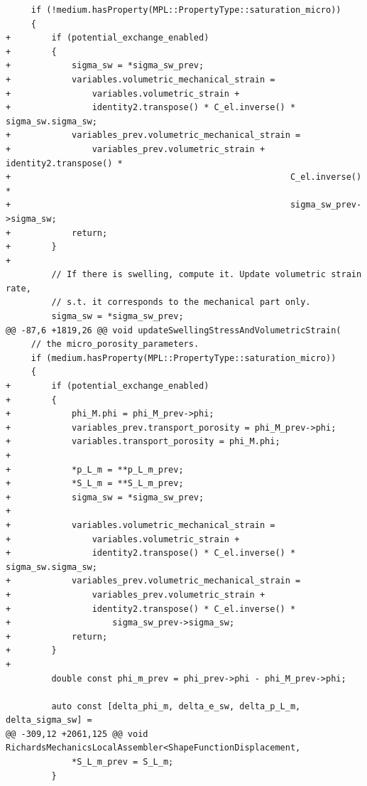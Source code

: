 \documentclass[10pt]{article}
\begin{document}
\begin{lstlisting}
     if (!medium.hasProperty(MPL::PropertyType::saturation_micro))
     {
+        if (potential_exchange_enabled)
+        {
+            sigma_sw = *sigma_sw_prev;
+            variables.volumetric_mechanical_strain =
+                variables.volumetric_strain +
+                identity2.transpose() * C_el.inverse() * sigma_sw.sigma_sw;
+            variables_prev.volumetric_mechanical_strain =
+                variables_prev.volumetric_strain + identity2.transpose() *
+                                                       C_el.inverse() *
+                                                       sigma_sw_prev->sigma_sw;
+            return;
+        }
+
         // If there is swelling, compute it. Update volumetric strain rate,
         // s.t. it corresponds to the mechanical part only.
         sigma_sw = *sigma_sw_prev;
@@ -87,6 +1819,26 @@ void updateSwellingStressAndVolumetricStrain(
     // the micro_porosity_parameters.
     if (medium.hasProperty(MPL::PropertyType::saturation_micro))
     {
+        if (potential_exchange_enabled)
+        {
+            phi_M.phi = phi_M_prev->phi;
+            variables_prev.transport_porosity = phi_M_prev->phi;
+            variables.transport_porosity = phi_M.phi;
+
+            *p_L_m = **p_L_m_prev;
+            *S_L_m = **S_L_m_prev;
+            sigma_sw = *sigma_sw_prev;
+
+            variables.volumetric_mechanical_strain =
+                variables.volumetric_strain +
+                identity2.transpose() * C_el.inverse() * sigma_sw.sigma_sw;
+            variables_prev.volumetric_mechanical_strain =
+                variables_prev.volumetric_strain +
+                identity2.transpose() * C_el.inverse() *
+                    sigma_sw_prev->sigma_sw;
+            return;
+        }
+
         double const phi_m_prev = phi_prev->phi - phi_M_prev->phi;
 
         auto const [delta_phi_m, delta_e_sw, delta_p_L_m, delta_sigma_sw] =
@@ -309,12 +2061,125 @@ void RichardsMechanicsLocalAssembler<ShapeFunctionDisplacement,
             *S_L_m_prev = S_L_m;
         }
 

\end{lstlisting}
\end{document}
